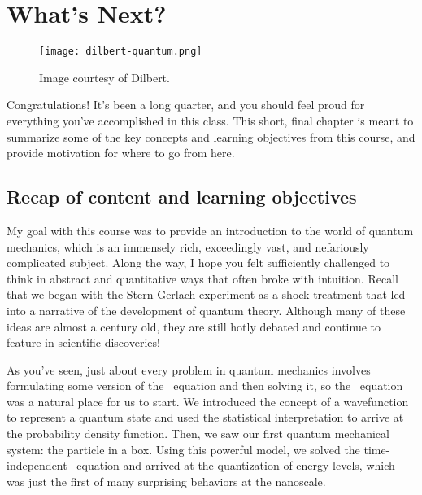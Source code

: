 

%

\chapter{What's Next?} \label{ch:next}

\begin{figure}[!h]
	\centering
	\texttt{[image: dilbert-quantum.png]}
	\caption{Image courtesy of Dilbert.}
\end{figure}

Congratulations! It's been a long quarter, and you should feel proud for everything you've accomplished in this class. 
This short, final chapter is meant to summarize some of the key concepts and learning objectives from this course, and provide motivation for where to go from here. 


\section[Recap]{Recap of content and learning objectives}

My goal with this course was to provide an introduction to the world of quantum mechanics, which is an immensely rich, exceedingly vast, and nefariously complicated subject. 
Along the way, I hope you felt sufficiently challenged to think in abstract and quantitative ways that often broke with intuition. 
Recall that we began with the Stern-Gerlach experiment as a shock treatment that led into a narrative of the development of quantum theory. 
Although many of these ideas are almost a century old, they are still hotly debated and continue to feature in scientific discoveries! 

As you've seen, just about every problem in quantum mechanics involves formulating some version of the \Sch\ equation and then solving it, so the \Sch\ equation was a natural place for us to start. 
We introduced the concept of a wavefunction to represent a quantum state and used the statistical interpretation to arrive at the probability density function. 
Then, we saw our first quantum mechanical system: the particle in a box. 
Using this powerful model, we solved the time-independent \Sch\ equation and arrived at the quantization of energy levels, which was just the first of many surprising behaviors at the nanoscale. 

